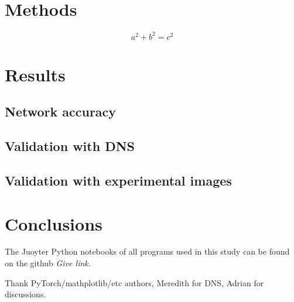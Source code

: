 \documentclass{svjour3}                     %
\begin{document}
\section{Methods}
\label{sec:methodology}

\begin{equation}
a^2+b^2=c^2
\end{equation}


\section{Results}

\subsection{Network accuracy}

\subsection{Validation with DNS}

\subsection{Validation with experimental images}

\section{Conclusions}

The Juoyter Python notebooks of all programs used in this study can be found on the github \textit{Give link}.

\begin{acknowledgements}
Thank PyTorch/mathplotlib/etc authors, Meredith for DNS, Adrian for discussions.
\end{acknowledgements}





\end{document}

